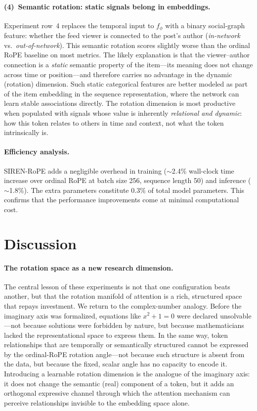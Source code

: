 \documentclass{article}
\begin{document}
\paragraph{(4)~Semantic rotation: static signals belong in embeddings.}
Experiment row~4 replaces the temporal input to $f_\phi$ with a binary
social-graph feature: whether the feed viewer is connected to the post's
author (\emph{in-network} vs.\ \emph{out-of-network}). This semantic
rotation scores slightly worse than the ordinal RoPE baseline on most
metrics. The likely explanation is that the viewer--author connection is a
\emph{static} semantic property of the item---its meaning does not change
across time or position---and therefore carries no advantage in the dynamic
(rotation) dimension. Such static categorical features are better modeled
as part of the item embedding in the sequence representation, where the
network can learn stable associations directly. The rotation dimension is
most productive when populated with signals whose value is inherently
\emph{relational and dynamic}: how this token relates to others in time and
context, not what the token intrinsically is.

\paragraph{Efficiency analysis.}
SIREN-RoPE adds a negligible overhead in training ($\sim$2.4\% wall-clock
time increase over ordinal RoPE at batch size 256, sequence length 50) and
inference ($\sim$1.8\%). The extra parameters constitute 0.3\% of total model
parameters. This confirms that the performance improvements come at minimal
computational cost.


\section{Discussion}
\label{sec:discussion}

\paragraph{The rotation space as a new research dimension.}
The central lesson of these experiments is not that one configuration beats
another, but that the rotation manifold of attention is a rich, structured
space that repays investment. We return to the complex-number analogy.
Before the imaginary axis was formalized, equations like $x^2 + 1 = 0$ were
declared unsolvable---not because solutions were forbidden by nature, but
because mathematicians lacked the representational space to express them.
In the same way, token relationships that are temporally or semantically
structured cannot be expressed by the ordinal-RoPE rotation angle---not
because such structure is absent from the data, but because the fixed,
scalar angle has no capacity to encode it. Introducing a learnable rotation
dimension is the analogue of the imaginary axis: it does not change the
semantic (real) component of a token, but it adds an orthogonal expressive
channel through which the attention mechanism can perceive relationships
invisible to the embedding space alone.
\end{document}
